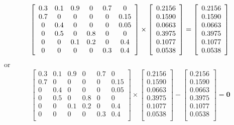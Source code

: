 \documentclass[a4paper,10pt]{article}
\begin{document}
\begin{equation*}
\left[\begin{array}{cccccc}
0.3 & 0.1 & 0.9 & 0 & 0.7 & 0 \\
0.7 & 0 & 0 & 0 & 0 & 0.15 \\
0 & 0.4 & 0 & 0 & 0 & 0.05 \\
0 & 0.5 & 0 & 0.8 & 0 & 0 \\
0 & 0 & 0.1 & 0.2 & 0 & 0.4 \\
0 & 0 & 0 & 0 & 0.3 & 0.4 \\
\end{array}\right]
\times
\left[\begin{array}{c}
0.2156
\\
0.1590
\\
0.0663
\\
0.3975
\\
0.1077
\\
0.0538 \\
\end{array}\right]
=
\left[\begin{array}{c}
0.2156
\\
0.1590
\\
0.0663
\\
0.3975
\\
0.1077
\\
0.0538 \\
\end{array}\right]\\
\end{equation*}
\newline\noindent\newline\noindent
or\\
\newline\noindent\newline\noindent
\begin{equation*}
\left[\begin{array}{cccccc}
0.3 & 0.1 & 0.9 & 0 & 0.7 & 0 \\
0.7 & 0 & 0 & 0 & 0 & 0.15 \\
0 & 0.4 & 0 & 0 & 0 & 0.05 \\
0 & 0.5 & 0 & 0.8 & 0 & 0 \\
0 & 0 & 0.1 & 0.2 & 0 & 0.4 \\
0 & 0 & 0 & 0 & 0.3 & 0.4 \\
\end{array}\right]
\times
\left[\begin{array}{c}
0.2156
\\
0.1590
\\
0.0663
\\
0.3975
\\
0.1077
\\
0.0538 \\
\end{array}\right]
-
\left[\begin{array}{c}
0.2156
\\
0.1590
\\
0.0663
\\
0.3975
\\
0.1077
\\
0.0538 \\
\end{array}\right] = \mathbf{0}
\end{equation*}
\end{document}
